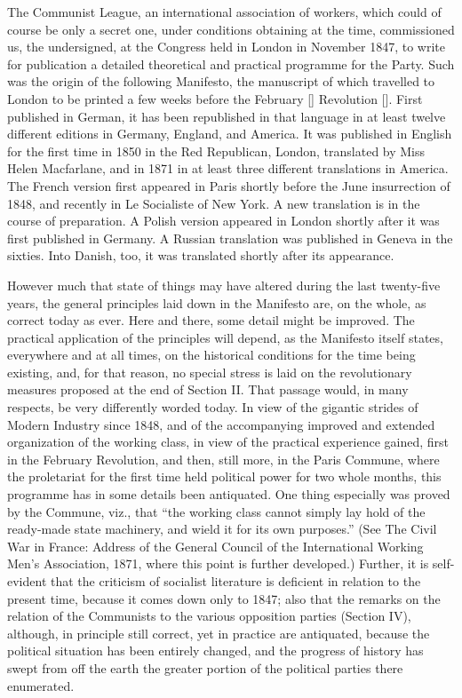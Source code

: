 The Communist League, an international association of workers, which could of course be only a secret one, under conditions obtaining at the time, commissioned us, the undersigned, at the Congress held in London in November 1847, to write for publication a detailed theoretical and practical programme for the Party. Such was the origin of the following Manifesto, the manuscript of which travelled to London to be printed a few weeks before the February [] Revolution []. First published in German, it has been republished in that language in at least twelve different editions in Germany, England, and America. It was published in English for the first time in 1850 in the Red Republican, London, translated by Miss Helen Macfarlane, and in 1871 in at least three different translations in America. The French version first appeared in Paris shortly before the June insurrection of 1848, and recently in Le Socialiste of New York. A new translation is in the course of preparation. A Polish version appeared in London shortly after it was first published in Germany. A Russian translation was published in Geneva in the sixties. Into Danish, too, it was translated shortly after its appearance. 

However much that state of things may have altered during the last twenty-five years, the general principles laid down in the Manifesto are, on the whole, as correct today as ever. Here and there, some detail might be improved. The practical application of the principles will depend, as the Manifesto itself states, everywhere and at all times, on the historical conditions for the time being existing, and, for that reason, no special stress is laid on the revolutionary measures proposed at the end of Section II. That passage would, in many respects, be very differently worded today. In view of the gigantic strides of Modern Industry since 1848, and of the accompanying improved and extended organization of the working class, in view of the practical experience gained, first in the February Revolution, and then, still more, in the Paris Commune, where the proletariat for the first time held political power for two whole months, this programme has in some details been antiquated. One thing especially was proved by the Commune, viz., that ``the working class cannot simply lay hold of the ready-made state machinery, and wield it for its own purposes.'' (See The Civil War in France: Address of the General Council of the International Working Men’s Association, 1871, where this point is further developed.) Further, it is self-evident that the criticism of socialist literature is deficient in relation to the present time, because it comes down only to 1847; also that the remarks on the relation of the Communists to the various opposition parties (Section IV), although, in principle still correct, yet in practice are antiquated, because the political situation has been entirely changed, and the progress of history has swept from off the earth the greater portion of the political parties there enumerated. 

